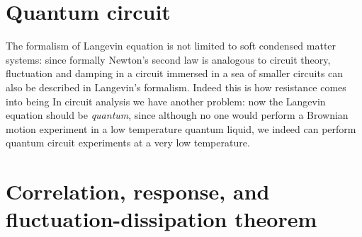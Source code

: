\documentclass[hyperref, a4paper]{article}
\begin{document}
\section{Quantum circuit}

The formalism of Langevin equation is not limited to soft condensed matter systems:
since formally Newton's second law 
is analogous to circuit theory,
fluctuation and damping in a circuit immersed in 
a sea of smaller circuits can also be described in Langevin's formalism.
Indeed this is how resistance comes into being 
In circuit analysis we have another problem:
now the Langevin equation should be \emph{quantum},
since although no one would perform a Brownian motion experiment 
in a low temperature quantum liquid,
we indeed can perform quantum circuit experiments 
at a very low temperature.


\section{Correlation, response, and fluctuation-dissipation theorem} 
\end{document}
